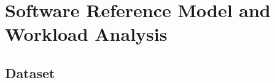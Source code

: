 %
\chapter{Software Reference Model and Workload Analysis}
\label{chap:software}

\section{Dataset}
\label{sec:dataset}

